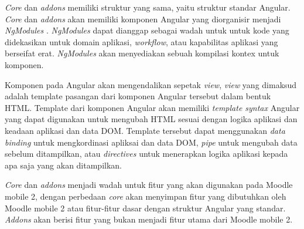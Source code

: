 \textit{Core} dan \textit{addons} memiliki struktur yang sama, yaitu struktur standar Angular. \textit{Core} dan \textit{addons} akan memiliki komponen Angular yang diorganisir menjadi \textit{NgModules}\cite{angular:architecture}
. \textit{NgModules} dapat dianggap sebagai wadah untuk untuk kode yang didekasikan untuk domain aplikasi, \textit{workflow}, atau kapabilitas aplikasi yang berseifat erat. \textit{NgModules} akan menyediakan sebuah kompilasi kontex untuk komponen. \cite{angular:architecture:modules}

Komponen pada Angular akan mengendalikan sepetak \textit{view}, \textit{view} yang dimaksud adalah template pasangan dari komponen Angular tersebut dalam bentuk HTML. Template dari komponen Angular akan memiliki \textit{template syntax} Angular yang dapat digunakan untuk mengubah HTML sesuai dengan logika aplikasi dan keadaan aplikasi dan data DOM. Template tersebut dapat menggunakan \textit{data binding} untuk mengkordinasi apliksai dan data DOM, \textit{pipe} untuk mengubah data sebelum ditampilkan, atau \textit{directives} untuk menerapkan logika aplikasi kepada apa saja yang akan ditampilkan. \cite{angular:architecture:components}

\textit{Core} dan \textit{addons} menjadi wadah untuk fitur yang akan digunakan pada Moodle mobile 2, dengan perbedaan \textit{core} akan menyimpan fitur yang dibutuhkan oleh Moodle mobile 2 atau fitur-fitur dasar dengan struktur Angular yang standar. \textit{Addons} akan berisi fitur yang bukan menjadi fitur utama dari Moodle mobile 2. \cite{moodle:dev}

